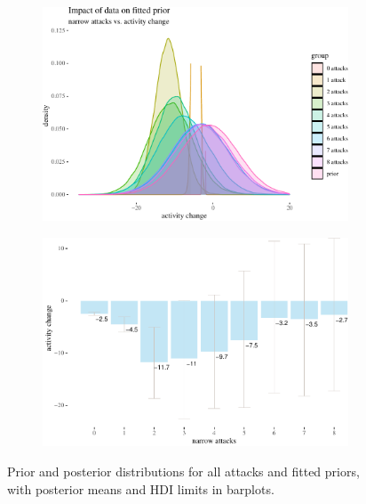 \documentclass[10pt,]{scrartcl}
\begin{document}
\begin{figure}[!ht]
\begin{subfigure}[!ht]{0.9\textwidth}

\begin{center}\includegraphics[width=1\linewidth]{redditAnalysisWalkthrough_files/figure-latex/unnamed-chunk-56-1} \end{center}
\end{subfigure} 


\begin{subfigure}[!ht]{0.9\textwidth}

\begin{center}\includegraphics[width=1\linewidth]{redditAnalysisWalkthrough_files/figure-latex/unnamed-chunk-57-1} \end{center}
\end{subfigure}
\caption{Prior and posterior distributions for all attacks and fitted priors, with posterior means and HDI limits in barplots.}
\label{fig:bayesian2}
\end{figure}
\end{document}

